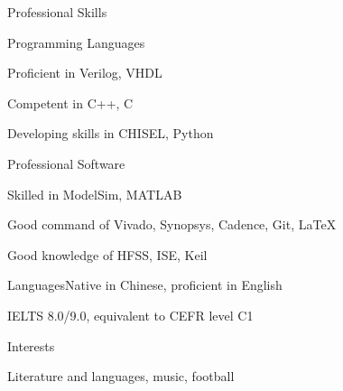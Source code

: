 \documentclass{resume} %
\begin{document}
\begin{rSection}{Professional Skills}
	
	\begin{rSubsection}{Programming Languages}{}{}{}
		\item Proficient in Verilog, VHDL
		\item Competent in C++, C
		\item Developing skills in CHISEL, Python
	\end{rSubsection}

	\begin{rSubsection}{Professional Software}{}{}{}
		\item Skilled in ModelSim, MATLAB 
		\item Good command of Vivado, Synopsys, Cadence, Git, LaTeX
		\item Good knowledge of HFSS, ISE, Keil
	\end{rSubsection}

	\begin{rSubsection}{Languages}{}{Native in Chinese, proficient in English}{}
		\item IELTS 8.0/9.0, equivalent to CEFR level C1
	\end{rSubsection}

\end{rSection}

\begin{rSection}{Interests}
	\item Literature and languages, music, football
\end{rSection}
\end{document}
